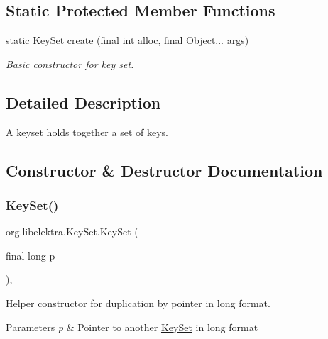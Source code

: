 \subsection*{Static Protected Member Functions}
\begin{DoxyCompactItemize}
\item 
static \hyperlink{classorg_1_1libelektra_1_1KeySet}{Key\+Set} \hyperlink{classorg_1_1libelektra_1_1KeySet_ae3f1cd9ac1a4fd2ef7d16e6c320bc6a3}{create} (final int alloc, final Object... args)
\begin{DoxyCompactList}\small\item\em Basic constructor for key set. \end{DoxyCompactList}\end{DoxyCompactItemize}


\subsection{Detailed Description}
A keyset holds together a set of keys. 

\subsection{Constructor \& Destructor Documentation}
\mbox{\label{classorg_1_1libelektra_1_1KeySet_a72507fbeb96bfb90e44562e0a8e70331}} 
\subsubsection{\texorpdfstring{Key\+Set()}{KeySet()}\hspace{0.1cm}{\footnotesize\ttfamily [1/2]}}
{\footnotesize\ttfamily org.\+libelektra.\+Key\+Set.\+Key\+Set (\begin{DoxyParamCaption}\item[{final long}]{p }\end{DoxyParamCaption})\hspace{0.3cm}{\ttfamily [inline]}, {\ttfamily [protected]}}



Helper constructor for duplication by pointer in long format. 


\begin{DoxyParams}{Parameters}
{\em p} & Pointer to another \hyperlink{classorg_1_1libelektra_1_1KeySet}{Key\+Set} in long format \\
\hline
\end{DoxyParams}
\mbox{\label{classorg_1_1libelektra_1_1KeySet_adf4ea02b31ed468e49c615f61ea57a15}} 
